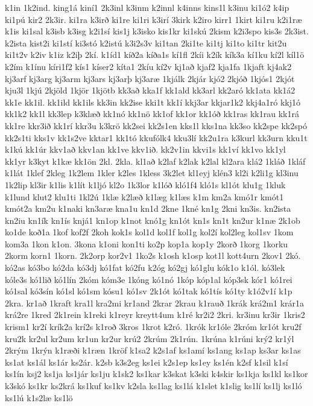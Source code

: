 {k1in
1k2ind.
king1á
kiní1
2k3inl
k3inm
k2innl
k4inns
kins1l
k3inu
ki1ó2
k4ip
ki1pú
kir2
2k3ir.
ki1ra
k3irð
ki1re
ki1ri
k3irí
3kirk
k2iro
kirr1
1kirt
ki1ru
k2i1ræ
k1is
ki1sal
k3isb
k3isg
k2i1sí
kis1j
k3isko
kis1kr
ki1skú
2kism
k2i3spo
kis3s
2k3ist.
k2ista
kist2i
ki1stí
ki3stó
k2istú
k3i2s3v
ki1tan
2ki1te
ki1tj
ki1to
ki1tr
kit2u
ki1t2v
k2iv
k1iz
k2iþ
2kí.
k1íd1
kíð2a
kíða1s
kí1fl
2kíi
k2ík
kík3a
kí1ku
kí2l
kíl1ö
k2ím
k1ínu
kíri1f2
kís1
kíser2
kíta1
2kíu
kí2v
kj1að
kjaf2
kja1fa
1kjaft
kj4ak2
kj3arf
kj3arg
kj3arm
kj3ars
kj3arþ
kj3aræ
1kjálk
2kjár
kjó2
2kjóð
1kjós1
2kjót
kju3l
1kjú
2kjöld
1kjör
1kjötb
kk3að
kka1f
kk1ald
kk3arl
kk2aró
kk1ata
kk1á2
kk1e
kk1il.
kk1ild
kk1ils
kk3in
kk2ise
kki1t
kk1í
kkj3ar
kkjar1k2
kkj4a1ró
kkj1ó
kk1k2
kk1l
kk3lep
k3klæð
kk1nó
kk1nö
kk1of
kk1or
kk1óð
kk1ras
kk1rau
kk1rá
kk1re
kkr3ið
kk1rí
kkr3u
k3krö
kk2sei
kk2s1en
kks1l
kks1na
kk3so
kk2spe
kk2spó
kk2s1ti
kks1v
kk1s2ve
kktar1
kk1tó
kkufólk4
kku3lí
kk2u1ra
k3kurl
kk3urn
kku1t
k1kú
kk1úr
kkv1að
kkv1an
kk1ve
kkv1ið.
kk2v1in
kkvi1s
kk1ví
kk1vo
kk1yl
kk1yr
k3kyt
k1kæ
kk1ön
2kl.
2kla.
kl1að
k2laf
k2lak
k2lal
kl2ara
klá2
1kláð
1kláf
k1lát
1klef
2kleg
1k2lem
1kler
k2les
1kless
3k2let
kl1eyj
klén3
kl2i
k2li1g
kl3inu
1k2lip
kl3ir
k1lis
k1lít
k1ljó
kl2o
1k3lor
k1lóð
kló1f4
kló1s
kl1ót
klu1g
1kluk
k1lund
klut2
klu1ti
1kl2ú
1klæ
k2læð
k1læg
k1læs
k1m
km2a
kmó1r
kmót1
kmót2a
km2u
k1naki
kn3aræ
kna1u
kn1d
2kne
1kné
kn1g
2kni
kn3is.
kn2ista
kn2iu
kn1ík
kn1ís
knjá1
kn1op
k1not
knó1g
kn1ót
kn1s
kn1t
kn2ur
k1næ
2k1ob
ko1de
koð1a
1kof
kof2f
2koh
kok1s
kol1d
kol1f
kol1g
kol2í
kol2leg
kol1sv
1kom
kom3a
1kon
k1on.
3kona
k1oni
kon1ti
ko2p
kop1a
kop1y
2korð
1korg
1korku
2korm
korn1
1korn.
2k2orp
kor2v1
1ko2s
k1osh
k1osp
kot1l
kott4urn
2kov1
2kó.
kó2as
kó3bo
kó2da
kó3dj
kó1fat
kó2fu
k2óg
kó2gj
kó1glu
kók1o
k1ól.
kó3lek
kóle3s
kó1lið
kó1lín
2kóm
kóm3e
1kóng
kó1nó
1kóp
kóp1al
kóp3sk
kór1
kó1rei
kó1sal
kó3sín
kó1sl
kó1sm
kósu1
kó1sv
2k1ót
kó1tak
kó1tís
kó1ty
k1ó2v1í
k1p
2kra.
kr1að
1kraft
kra1l
kra2mi
kr1and
2krar
2krau
k1rauð
1krák
krá2m1
krár1a
krá2re
1kred
2k1rein
k1reki
k1reyr
kreytt4um
k1ré
kr2i2
2kri.
kr3inu
kr3ir
1kris2
krism1
kr2í
krík2a
krí2s
k1roð
3kros
1krot
k2ró.
1krók
kr1óle
2króm
kr1ót
kru2f
kru2k
kr2ul
kr2um
kr1un
kr2ur
krú2
2krúm
2k1rún.
1krúna
k1rúni
krý2
kr1ýl
2krým
1krýn
k1ræði
k1ræn
1kröf
k1sa2
k2s1af
ks1amí
ks1ang
ks1ap
ks3ar
ks1as
ks1at
ks1ál
ks1ár
ks2ár.
k2sb
k3s2eg
ks1ei
k2s1ep
ks1ey
ks1én
k2sf
k1sil
k1sí
ks1ín
ksj2
ks1ja
ks1jár
ks1ju
k1sk2
ks1kar
k3skat
k3ski
k4skir
ks1kja
ks1kl
ks1kor
k3skó
ks1kr
ks2krá
ks1kuf
ks1kv
k2sla
ks1lag
ks1lá
k1slet
k1slig
ks1lí
ks1lj
ks1ló
ks1lú
k1s2læ
ks1lö
}
